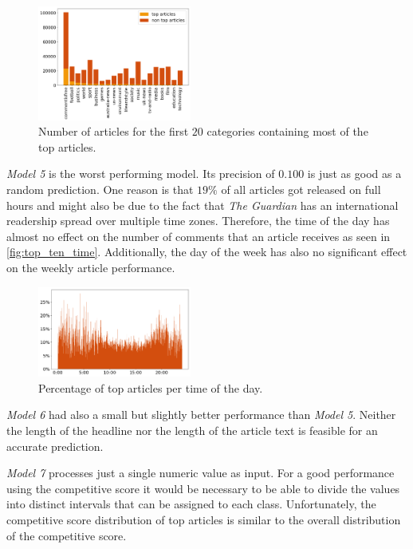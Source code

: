 \begin{figure}[h]
	\includegraphics[width=0.45\textwidth]{fig/top_ten_category.png}
	\caption{\textmd{Number of articles for the first $20$ categories containing most of the top articles.}}
	\label{fig:top_ten_category}
\end{figure}

\textit{Model 5} is the worst performing model. Its precision of $0.100$ is just as good as a random prediction.
One reason is that $19\%$ of all articles got released on full hours and might also be due to the fact that \textit{The Guardian} has an international readership spread over multiple time zones. 
Therefore, the time of the day has almost no effect on the number of comments that an article receives as seen in \autoref{fig:top_ten_time}. 
Additionally, the day of the week has also no significant effect on the weekly article performance. 

\begin{figure}[h]
	\includegraphics[width=0.45\textwidth]{fig/top_ten_time.png}
	\caption{\textmd{Percentage of top articles per time of the day.}}
	\label{fig:top_ten_time}
\end{figure}

\textit{Model 6} had also a small but slightly better performance than \textit{Model 5}. 
Neither the length of the headline nor the length of the article text is feasible for an accurate prediction.

\textit{Model 7} processes just a single numeric value as input. For a good performance using the competitive score it would be necessary to be able to divide the values into distinct intervals that can be assigned to each class.
Unfortunately, the competitive score distribution of top articles is similar to the overall distribution of the competitive score.

